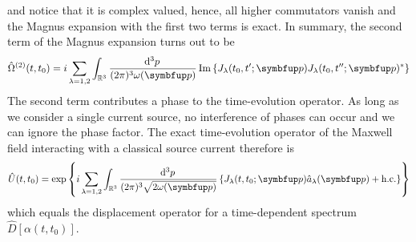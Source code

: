and notice that it is complex valued, hence, all higher commutators vanish and the Magnus expansion with the first two terms is exact.
In summary, the second term of the Magnus expansion turns out to be
\begin{equation}
	\hat{\Omega}^{(2)}(t,t_0)
	=
	i\sum_{\lambda=1,2}
	\int_{\mathbb{R}^3}\frac{\dd[3]{p}}{(2\pi)^3\omega(\vb{p})}
	\Im\left\{
		J_\lambda(t_0,t^\prime;\vb{p})
		J_\lambda(t_0,t^{\prime\prime};\vb{p})^*
	\right\}
\end{equation}
The second term contributes a phase to the time-evolution operator.
As long as we consider a single current source, no interference of phases can occur and we can ignore the phase factor.
The exact time-evolution operator of the Maxwell field interacting with a classical source current therefore is
\begin{equation}
	\hat{U}(t,t_0)
	=
	\exp\left\{
		i\sum_{\lambda=1,2}
		\int_{\mathbb{R}^3}\frac{\dd[3]{p}}{(2\pi)^3\sqrt{2\omega(\vb{p})}}
		\left\{
			J_\lambda(t,t_0;\vb{p})
			\hat{a}_\lambda(\vb{p})
			+
			\text{h.c.}
		\right\}
	\right\}
\end{equation}
which equals the displacement operator for a time-dependent spectrum $\hat{D}[\alpha(t,t_0)]$.